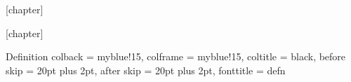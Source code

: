 
\newcommand{\N}{\mathbb{N}}          %
\newcommand{\Z}{\mathbb{Z}}          %
\newcommand{\Q}{\mathbb{Q}}          %
\newcommand{\R}{\mathbb{R}}          %
\newcommand{\C}{\mathbb{C}}          %
\newcommand{\ind}{\mathbbm{1}}       %
\newcommand{\bigO}{\mathcal{O}}      %
\renewcommand{\vec}[1]{\bm{#1}}      %
\usepackage{xcolor}
\usepackage{pgfplots}

\theoremstyle{plain}                 %

\theoremstyle{definition}          	%
[chapter]
\newenvironment{eks}{
\bigskip
\refstepcounter{example}
\textbf{Example~\thechapter.\theexample}
\phantom{.}\newline\noindent\rule{\textwidth}{0.4pt}
}
{\phantom{.}\newline\rule{\textwidth}{0.4pt}}  

[chapter]
\renewenvironment{proof}{
\bigskip
\refstepcounter{proof}
\textbf{Bevis~\thechapter.\theproof}
\phantom{.}\newline\noindent\rule{\textwidth}{0.4pt}
}
{\phantom{.}\newline\noindent\rule{\textwidth}{0.4pt}}  

{Definition}
{
colback		= myblue!15,
colframe	= myblue!15,
coltitle	= black,
before skip	= 20pt plus 2pt,
after skip	= 20pt plus 2pt,
fonttitle	= \bfseries
}
{defn}

